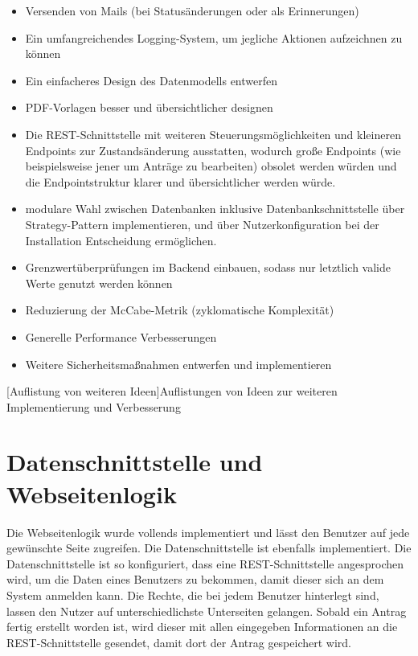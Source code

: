 \begin{itemize}
	\item Versenden von Mails (bei Statusänderungen oder als Erinnerungen)
	\item Ein umfangreichendes Logging-System, um jegliche Aktionen aufzeichnen zu können
	\item Ein einfacheres Design des Datenmodells entwerfen
	\item PDF-Vorlagen besser und übersichtlicher designen
	\item Die REST-Schnittstelle mit weiteren Steuerungsmöglichkeiten und kleineren Endpoints zur Zustandsänderung ausstatten, wodurch große Endpoints (wie beispielsweise jener um Anträge zu bearbeiten) obsolet werden würden und die Endpointstruktur klarer und übersichtlicher werden würde.
	\item modulare Wahl zwischen Datenbanken inklusive Datenbankschnittstelle über Strategy-Pattern implementieren, und über Nutzerkonfiguration bei der Installation Entscheidung ermöglichen.
	\item Grenzwertüberprüfungen im Backend einbauen, sodass nur letztlich valide Werte genutzt werden können
	\item Reduzierung der McCabe-Metrik (zyklomatische Komplexität)
	\item Generelle Performance Verbesserungen
	\item Weitere Sicherheitsmaßnahmen entwerfen und implementieren
\end{itemize}
[Auflistung von weiteren Ideen]{Auflistungen von Ideen zur weiteren Implementierung und Verbesserung}
\newpage
\section{Datenschnittstelle und Webseitenlogik}
Die Webseitenlogik wurde vollends implementiert und lässt den Benutzer auf jede gewünschte Seite zugreifen. Die Datenschnittstelle ist ebenfalls implementiert. Die Datenschnittstelle ist so konfiguriert, dass eine REST-Schnittstelle angesprochen wird, um die Daten eines Benutzers zu bekommen, damit dieser sich an dem System anmelden kann. Die Rechte, die bei jedem Benutzer hinterlegt sind, lassen den Nutzer auf unterschiedlichste Unterseiten gelangen. Sobald ein Antrag fertig erstellt worden ist, wird dieser mit allen eingegeben Informationen an die REST-Schnittstelle gesendet, damit dort der Antrag gespeichert wird.\\

